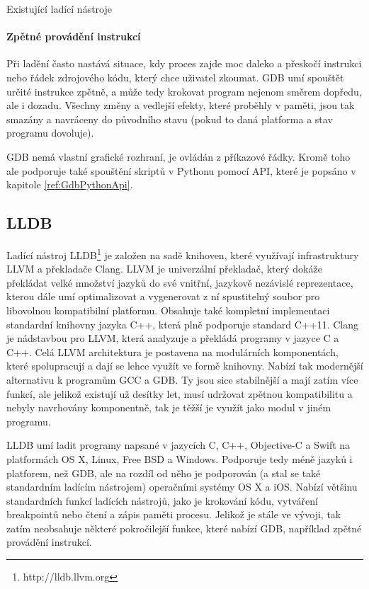 \documentclass[czech,bachelor,male,python,dept460]{diploma}						%
\newcommand{\parspace}[1][]{
	\ifthenelse{\isempty{#1}}{\vspace{5mm}}{\vspace{#1}}
	\par
}
\begin{document}
\begin{section}{Existující ladící nástroje}
		\paragraph*{Zpětné provádění instrukcí}
			Při ladění často nastává situace, kdy proces zajde moc daleko a přeskočí instrukci nebo řádek zdrojového kódu, který chce uživatel zkoumat.
			GDB umí spouštět určité instrukce zpětně, a může tedy krokovat program nejenom směrem dopředu, ale i dozadu.
			Všechny změny a vedlejší efekty, které proběhly v paměti, jsou tak smazány a navráceny do původního stavu (pokud to daná platforma a stav programu dovoluje).
		
		\parspace GDB nemá vlastní grafické rozhraní, je ovládán z příkazové řádky. Kromě toho ale podporuje také spouštění skriptů v Pythonu pomocí API,
		které je popsáno v kapitole \ref{ref:GdbPythonApi}.
	\subsection{LLDB}
		Ladící nástroj LLDB\footnote{http://lldb.llvm.org} je založen na sadě knihoven, které využívají infrastruktury LLVM a překladače Clang.
		LLVM je univerzální překladač, který dokáže překládat velké množství jazyků do své vnitřní, jazykově nezávislé reprezentace, kterou dále umí
		optimalizovat a vygenerovat z ní spustitelný soubor pro libovolnou kompatibilní platformu. Obsahuje také kompletní implementaci standardní
		knihovny jazyka C++, která plně podporuje standard C++11. Clang je nádstavbou pro LLVM, která analyzuje a překládá programy v jazyce
		C a C++. Celá LLVM architektura je postavena na modulárních komponentách, které spolupracují a dají se lehce využít ve formě knihovny.
		Nabízí tak modernější alternativu k programům GCC a GDB. Ty jsou sice stabilnější a mají zatím více funkcí, ale jelikož existují už desítky let, musí
		udržovat zpětnou kompatibilitu a nebyly navrhovány komponentně, tak je těžší je využít jako modul v jiném programu.
		
		\parspace LLDB umí ladit programy napsané v jazycích C, C++, Objective-C a Swift na platformách OS X, Linux, Free BSD a Windows. Podporuje tedy méně jazyků
		i platforem, než GDB, ale na rozdíl od něho je podporován (a stal se také standardním ladícím nástrojem) operačními systémy OS X a iOS.
		Nabízí většinu standardních funkcí ladících nástrojů, jako je krokování kódu, vytváření breakpointů nebo čtení a zápis paměti procesu.
		Jelikož je stále ve vývoji, tak zatím neobsahuje některé pokročilejší funkce, které nabízí GDB, například zpětné provádění instrukcí.


\end{section}
\end{document}
